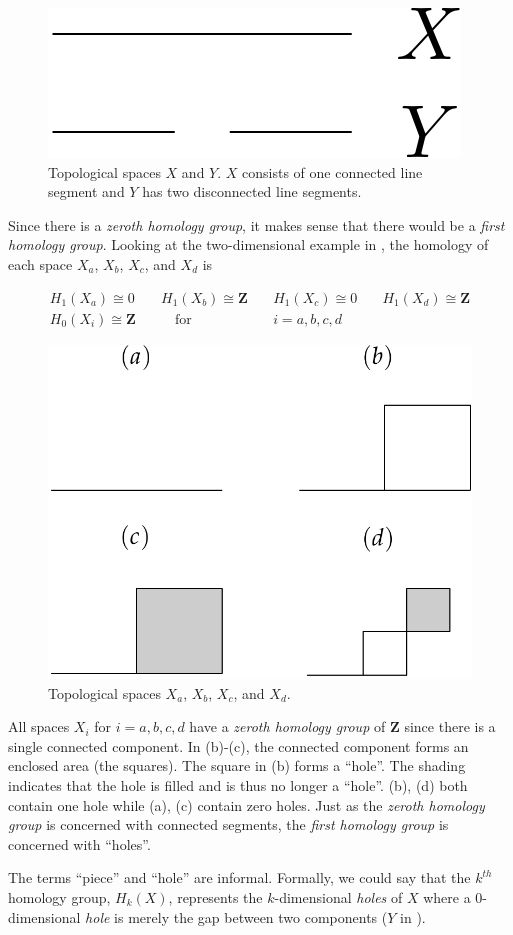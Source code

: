 \begin{figure}
	\begin{center}
		\includegraphics[width=0.2\columnwidth]{Figs/homology1d.pdf}
		\caption{\label{fig:homology1d} Topological spaces $X$ and $Y$. $X$ consists of one connected line segment and $Y$ has two disconnected line segments.}
	\end{center}
\end{figure}

Since there is a \textit{zeroth homology group}, it makes sense that there would be a \textit{first homology group}. Looking at the two-dimensional example in , the homology of each space $X_a$, $X_b$, $X_c$, and $X_d$ is

\begin{align}
	H_1(X_a) \cong 0  & \quad H_1(X_b) \cong \mathbf{Z} & \quad H_1(X_c) \cong 0 & \quad H_1(X_d) \cong \mathbf{Z} \\
	H_0(X_i) \cong \mathbf{Z} & \qquad \text{for} & \quad i = a, b, c, d \label{eq:homology2d}
\end{align}

\begin{figure}
	\begin{center}
		\includegraphics[width=0.6\columnwidth]{Figs/homology2d.pdf}
		\caption{\label{fig:homology2d} Topological spaces $X_a$, $X_b$, $X_c$, and $X_d$.}
	\end{center}
\end{figure}

All spaces $X_i$ for $i = a,b,c,d$ have a \textit{zeroth homology group} of $\mathbf{Z}$ since there is a single connected component. In (b)-(c), the connected component forms an enclosed area (\eg the squares). The square in (b) forms a ``hole''. The shading indicates that the hole is filled and is thus no longer a ``hole''. (b), (d) both contain one hole while (a), (c) contain zero holes. Just as the \textit{zeroth homology group} is concerned with connected segments, the \textit{first homology group} is concerned with ``holes''.

The terms ``piece'' and ``hole'' are informal. Formally, we could say that the $k^{th}$ homology group, $H_k(X)$, represents the $k$-dimensional \textit{holes} of $X$ where a 0-dimensional \textit{hole} is merely the gap between two components (\eg $Y$ in ).


